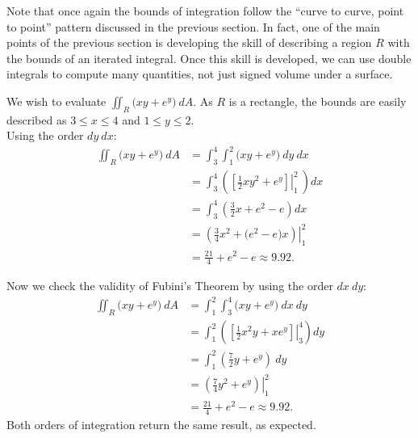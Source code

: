 Note that once again the bounds of integration follow the ``curve to curve, point to point'' pattern discussed in the previous section. In fact, one of the main points of the previous section is developing the skill of describing a region $R$ with the bounds of an iterated integral. Once this skill is developed, we can use double integrals to compute many quantities, not just signed volume under a surface.\\

{We wish to evaluate $\iint_R \big(xy+e^y\big)\ dA$. As $R$ is a rectangle, the bounds are easily described as $3\leq x\leq 4$ and $1\leq y\leq 2$.\\

Using the order $dy\ dx$:
\begin{align*}
\iint_R\big(xy+e^y\big) \ dA &= \int_3^4\int_1^2\big(xy+e^y\big)\ dy \ dx \\
			&= \int_3^4 \left(\left.\left[\frac12xy^2+e^y\right]\right|_1^2\ \right) dx \\
			&= \int_3^4\left(\frac 32x + e^2-e\right)dx \\
			&= \left.\left(\frac 34x^2 + \big(e^2-e\big)x\right)\right|_1^2 \\
			&= \frac {21}4+ e^2-e\approx 9.92.
\end{align*}


Now we check the validity of Fubini's Theorem by using the order $dx\ dy$:
\begin{align*}
\iint_R\big(xy+e^y\big) \ dA &= \int_1^2\int_3^4\big(xy+e^y\big)\ dx \ dy \\
		&= \int_1^2\left(\left.\left[\frac12x^2y+xe^y\right]\right|_3^4\right)dy\\
		&= \int_1^2\left(\frac72y+e^y\right)\ dy\\
		&= \left.\left(\frac74y^2+e^y\right)\right|_1^2\\
		&=\frac{21}4+e^2-e\approx 9.92.
\end{align*}
Both orders of integration return the same result, as expected.
}\\

